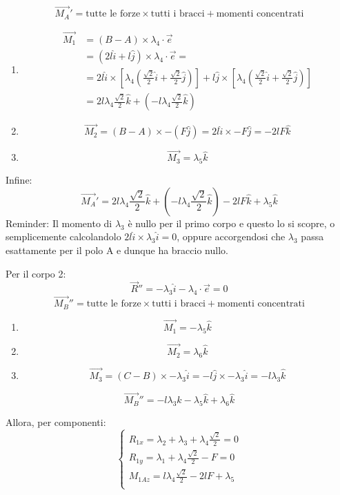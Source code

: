 \documentclass{article}
\begin{document}
\begin{adjustwidth}{2in}{}
\[
\vec{M_A}' = \text{tutte le forze} \times \text{tutti i bracci} + \text{momenti concentrati}
\]
\begin{enumerate}
\item 
\[
\begin{split}
\vec{M_1} & =(B-A) \times \lambda_4\cdot\vec{e} \\
& = (2l\hat{i} + l\hat{j}) \times \lambda_4\cdot\vec{e} = \\
& = 2l\hat{i} \times \left[ \lambda_4\left(  \frac{\sqrt{2}}{2}\hat{i} + \frac{\sqrt{2}}{2}\hat{j} \right)  \right]  + l\hat{j} \times \left[ \lambda_4\left(  \frac{\sqrt{2}}{2}\hat{i} + \frac{\sqrt{2}}{2}\hat{j} \right) \right]  \\
& = 2l\lambda_4 \frac{\sqrt{2}}{2} \hat{k} + \left( -l\lambda_4 \frac{\sqrt{2}}{2} \hat{k}\right)  
\end{split}
\]
\item 
\[
\vec{M_2}  = (B-A) \times -(F\hat{j})= 2l\hat{i} \times -F\hat{j} = -2lF\hat{k}
\]
\item 
\[
\vec{M_3}  = \lambda_5 \hat{k}
\]
\end{enumerate} 
Infine:
\[
\vec{M_A}' = 2l\lambda_4 \frac{\sqrt{2}}{2} \hat{k} + \left( -l\lambda_4 \frac{\sqrt{2}}{2} \hat{k}\right) -2lF\hat{k} + \lambda_5 \hat{k}
\]
Reminder: Il momento di $\lambda_3$ è nullo per il primo corpo e questo lo si scopre, o semplicemente calcolandolo $2l\hat{i} \times \lambda_3\hat{i} = 0$, oppure accorgendosi che $\lambda_3$ passa esattamente per il polo A e dunque ha braccio nullo. \newline

Per il corpo 2:
\[
\vec{R}'' = -\lambda_3 \hat{i} - \lambda_4 \cdot \vec{e}  = 0
\]
\[
\vec{M_B}'' = \text{tutte le forze} \times \text{tutti i bracci} + \text{momenti concentrati}
\]
\begin{enumerate}
	\item 
	\[
	\vec{M_1} = -\lambda_5 \hat{k} 
	\]
	\item 
	\[
	\vec{M_2} = \lambda_6 \hat{k}
	\]
	\item 
	\[
	\vec{M_3} = (C-B)\times -\lambda_3 \hat{i} = -l\hat{j} \times -\lambda_3 \hat{i} = -l\lambda_3\hat{k}
	\]
\end{enumerate}

\[
\vec{M_B}'' = -l\lambda_3\hat{k} -\lambda_5 \hat{k}  + \lambda_6 \hat{k}
\]
		
Allora, per componenti: 
\[
\begin{cases}
	R_{1x} = \lambda_2 + \lambda_3 + \lambda_4\frac{\sqrt{2}}{2} = 0 \\
	R_{1y} = \lambda_1 + \lambda_4\frac{\sqrt{2}}{2} - F = 0 \\
	M_{1Az} = l\lambda_4\frac{\sqrt{2}}{2} - 2lF + \lambda_5 \\
	

\end{cases}\]
\end{adjustwidth}
\end{document}
